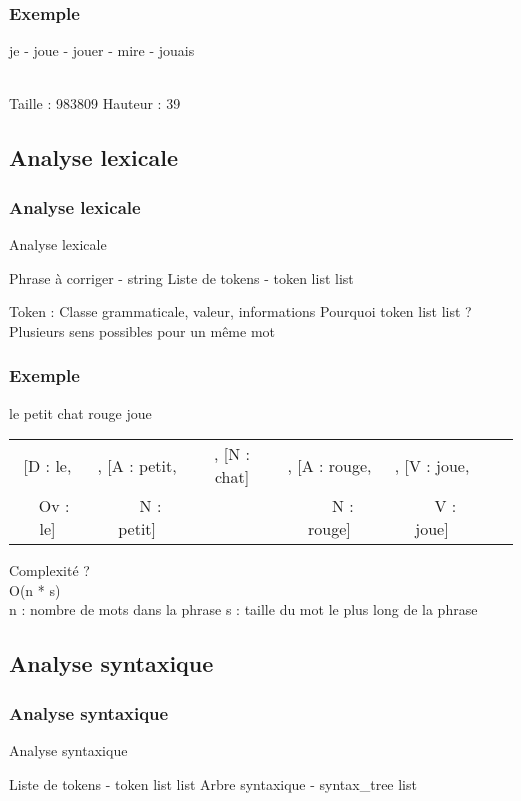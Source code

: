 \documentclass{beamer}
\begin{document}
\begin{frame}
   \frametitle{Exemple}
   \begin{center}
   je - joue - jouer - mire - jouais\\
   \end{center}
   \centering
   \\
   Taille : 983809 \; \; Hauteur : 39
\end{frame}

\subsection{Analyse lexicale}
\begin{frame}
   \frametitle{Analyse lexicale}
   \begin{algorithm}[H]
      \caption{Analyse lexicale}
      \begin{algorithmic}
         \Require Phrase à corriger - string
         \Ensure Liste de tokens - token list list
      \end{algorithmic}
   \end{algorithm}
   Token : Classe grammaticale, valeur, informations\bigbreak
   Pourquoi token list list ?\\
   Plusieurs sens possibles pour un même mot
\end{frame}

\begin{frame}
   \frametitle{Exemple}
   le petit chat rouge joue\bigbreak
   \begin{tabular}{c c c c c c c}
      [D : le, &, [A : petit, &, [N : chat] &, [A : rouge, &, [V : joue, \\
       ~ Ov : le] & ~ ~ N : petit] & & ~ ~ N : rouge] & ~ ~ V : joue]
   \end{tabular}
   \bigbreak
   Complexité ?\\
   O(n * s)\\
   n : nombre de mots dans la phrase
   s : taille du mot le plus long de la phrase
\end{frame}

\subsection{Analyse syntaxique}
\begin{frame}
   \frametitle{Analyse syntaxique}
   \begin{algorithm}[H]
      \caption{Analyse syntaxique}
      \begin{algorithmic}
         \Require Liste de tokens - token list list
         \Ensure Arbre syntaxique - syntax\_tree list
      \end{algorithmic}
   \end{algorithm}
\end{frame}
\end{document}
